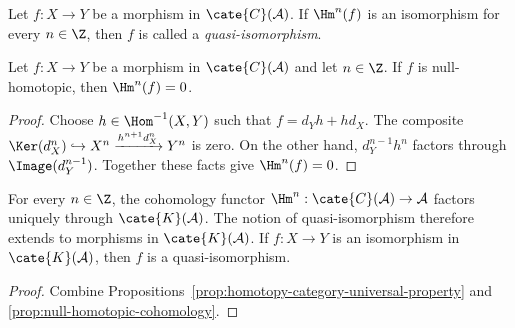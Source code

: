 \begin{definition}\label{def:quasi-isomorphism}
	Let $f:X\to Y$ be a morphism in $\cate{C}(\mathcal{A})$. If $\Hm^n(f)$
	is an isomorphism for every $n\in\Z$, then $f$ is called a
	\emph{quasi-isomorphism}.
\end{definition}

\begin{proposition}\label{prop:null-homotopic-cohomology}
	Let $f:X\to Y$ be a morphism in $\cate{C}(\mathcal{A})$ and let
	$n\in\Z$. If $f$ is null-homotopic, then $\Hm^n(f)=0$.
\end{proposition}

\begin{proof}
	Choose $h\in\Hom^{-1}(X,Y)$ such that $f=d_Yh+hd_X$. The composite
	$\Ker(d_X^n)\hookrightarrow X^n\xrightarrow{h^{n+1}d_X^n}Y^n$ is zero.
	On the other hand, $d_Y^{n-1}h^n$ factors through
	$\Image(d_Y^{n-1})$. Together these facts give $\Hm^n(f)=0$.
\end{proof}

\begin{corollary}
	For every $n\in\Z$, the cohomology functor
	$\Hm^n:\cate{C}(\mathcal{A})\to\mathcal{A}$ factors uniquely through
	$\cate{K}(\mathcal{A})$. The notion of quasi-isomorphism therefore extends
	to morphisms in $\cate{K}(\mathcal{A})$. If $f:X\to Y$ is an isomorphism
	in $\cate{K}(\mathcal{A})$, then $f$ is a quasi-isomorphism.
\end{corollary}

\begin{proof}
	Combine Propositions~\ref{prop:homotopy-category-universal-property} and
	\ref{prop:null-homotopic-cohomology}.
\end{proof}
